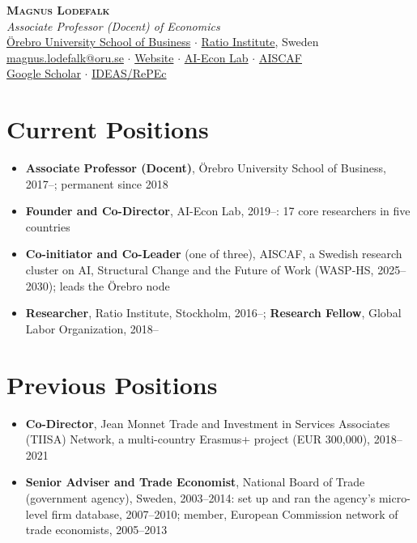 \documentclass[11pt,a4paper]{article}
\newcommand{\cventry}[1]{\item #1}
\begin{document}
\begin{center}
 {\LARGE\bfseries\scshape Magnus Lodefalk}\\[4pt]
 \textit{Associate Professor (Docent) of Economics}\\[2pt]
 \href{https://www.oru.se/english/employee/magnus_lodefalk}{Örebro University School of Business} $\cdot$ \href{https://www.ratio.se/medarbetare/magnus-lodefalk/}{Ratio Institute}, Sweden\\[3pt]
 \href{mailto:magnus.lodefalk@oru.se}{magnus.lodefalk@oru.se} $\cdot$
 \href{https://sites.google.com/view/magnuslodefalk}{Website} $\cdot$
 \href{https://www.ai-econlab.com}{AI-Econ Lab} $\cdot$
 \href{https://www.aiscaf.se}{AISCAF}\\[2pt]
 \href{https://scholar.google.com/citations?user=z0WQ2JcAAAAJ}{Google Scholar} $\cdot$
 \href{https://ideas.repec.org/f/plo250.html}{IDEAS/RePEc}
\end{center}

\vspace{2pt}

\section{Current Positions}
\vspace{-2pt}
\begin{itemize}
 \cventry{\textbf{Associate Professor (Docent)}, Örebro University School of Business, 2017--; permanent since 2018}
 \cventry{\textbf{Founder and Co-Director}, AI-Econ Lab, 2019--: 17 core researchers in five countries} %
 \cventry{\textbf{Co-initiator and Co-Leader} (one of three), AISCAF, a Swedish research cluster on AI, Structural Change and the Future of Work (WASP-HS, 2025--2030); leads the Örebro node} %
 \cventry{\textbf{Researcher}, Ratio Institute, Stockholm, 2016--; \textbf{Research Fellow}, Global Labor Organization, 2018--}
\end{itemize}

\section{Previous Positions}
\vspace{-2pt}
\begin{itemize}
 \cventry{\textbf{Co-Director}, Jean Monnet Trade and Investment in Services Associates (TIISA) Network, a multi-country Erasmus+ project (EUR 300,000), 2018--2021}
 \cventry{\textbf{Senior Adviser and Trade Economist}, National Board of Trade (government agency), Sweden, 2003--2014: set up and ran the agency's micro-level firm database, 2007--2010; member, European Commission network of trade economists, 2005--2013}
\end{itemize}
\end{document}
